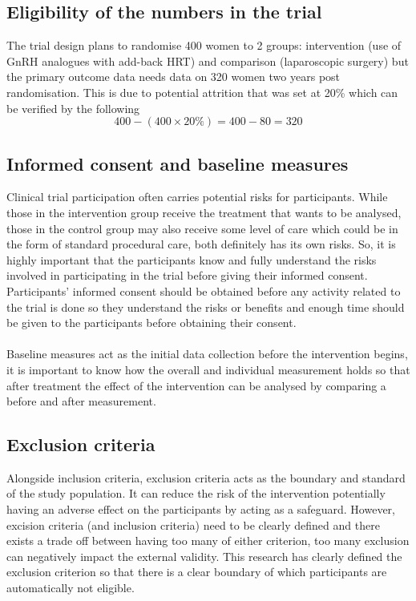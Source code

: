 \documentclass{article}
\begin{document}
\subsection{Eligibility of the numbers in the trial}
The trial design plans to randomise 400 women to 2 groups: intervention (use of GnRH analogues with add-back HRT) and comparison (laparoscopic surgery) but the primary outcome data needs data on 320 women two years post randomisation. This is due to potential attrition that was set at 20\% which can be verified by the following
\begin{equation*}
    400 - (400 \times 20\%) = 400 - 80 = 320
\end{equation*}

\subsection{Informed consent and baseline measures}
Clinical trial participation often carries potential risks for participants. While those in the intervention group receive the treatment that wants to be analysed, those in the control group may also receive some level of care which could be in the form of standard procedural care, both definitely has its own risks. So, it is highly important that the participants know and fully understand the risks involved in participating in the trial before giving their informed consent. Participants' informed consent should be obtained before any activity related to the trial is done so they understand the risks or benefits and enough time should be given to the participants before obtaining their consent.
\\~\\
Baseline measures act as the initial data collection before the intervention begins, it is important to know how the overall and individual measurement holds so that after treatment the effect of the intervention can be analysed by comparing a before and after measurement.

\subsection{Exclusion criteria}
Alongside inclusion criteria, exclusion criteria acts as the boundary and standard of the study population. It can reduce the risk of the intervention potentially having an adverse effect on the participants by acting as a safeguard. However, excision criteria (and inclusion criteria) need to be clearly defined and there exists a trade off between having too many of either criterion, too many exclusion can negatively impact the external validity\autocite{exclusion-criteria}. This research has clearly defined the exclusion criterion so that there is a clear boundary of which participants are automatically not eligible.
\end{document}
